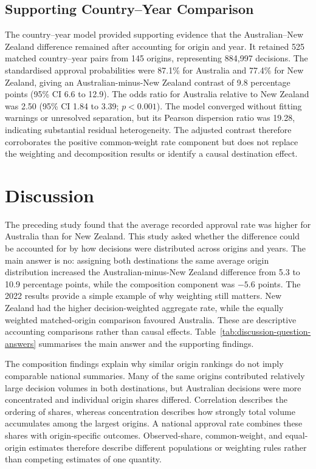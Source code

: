 \documentclass[runningheads]{llncs}
\begin{document}
\subsection{Supporting Country--Year Comparison}

The country--year model provided supporting evidence that the Australian--New Zealand difference remained after accounting for origin and year. It retained 525 matched country--year pairs from 145 origins, representing 884,997 decisions. The standardised approval probabilities were 87.1\% for Australia and 77.4\% for New Zealand, giving an Australian-minus-New Zealand contrast of 9.8 percentage points (95\% CI 6.6 to 12.9). The odds ratio for Australia relative to New Zealand was 2.50 (95\% CI 1.84 to 3.39; $p<0.001$). The model converged without fitting warnings or unresolved separation, but its Pearson dispersion ratio was 19.28, indicating substantial residual heterogeneity. The adjusted contrast therefore corroborates the positive common-weight rate component but does not replace the weighting and decomposition results or identify a causal destination effect.

\section{Discussion}

The preceding study found that the average recorded approval rate was higher for Australia than for New Zealand. This study asked whether the difference could be accounted for by how decisions were distributed across origins and years. The main answer is no: assigning both destinations the same average origin distribution increased the Australian-minus-New Zealand difference from 5.3 to 10.9 percentage points, while the composition component was $-5.6$ points. The 2022 results provide a simple example of why weighting still matters. New Zealand had the higher decision-weighted aggregate rate, while the equally weighted matched-origin comparison favoured Australia. These are descriptive accounting comparisons rather than causal effects. Table~\ref{tab:discussion-question-answers} summarises the main answer and the supporting findings.



The composition findings explain why similar origin rankings do not imply comparable national summaries. Many of the same origins contributed relatively large decision volumes in both destinations, but Australian decisions were more concentrated and individual origin shares differed. Correlation describes the ordering of shares, whereas concentration describes how strongly total volume accumulates among the largest origins. A national approval rate combines these shares with origin-specific outcomes. Observed-share, common-weight, and equal-origin estimates therefore describe different populations or weighting rules rather than competing estimates of one quantity.
\end{document}
